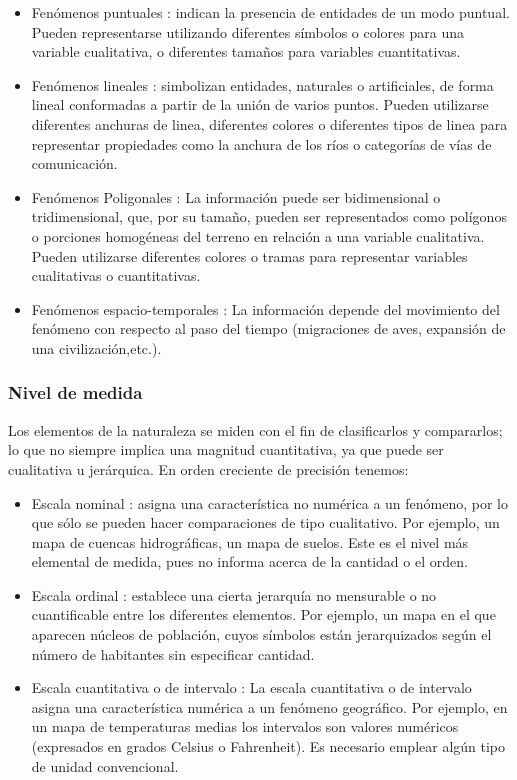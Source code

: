 \begin{itemize}
    \item Fenómenos puntuales : indican la presencia de entidades de un modo puntual. Pueden representarse
    utilizando diferentes símbolos o colores para una variable cualitativa, o diferentes tamaños para variables
    cuantitativas.

    \item Fenómenos lineales : simbolizan entidades, naturales o artificiales, de forma lineal conformadas a
    partir de la unión de varios puntos. Pueden utilizarse diferentes anchuras de linea, diferentes colores o
    diferentes tipos de linea para representar propiedades como la anchura de los ríos o categorías de vías de
    comunicación.

    \item Fenómenos Poligonales : La información puede ser bidimensional o tridimensional, que, por su tamaño,
    pueden ser representados como polígonos o porciones homogéneas del terreno en relación a una variable
    cualitativa. Pueden utilizarse diferentes colores o tramas para representar variables cualitativas o
    cuantitativas.

    \item Fenómenos espacio-temporales : La información depende del movimiento del fenómeno con respecto al paso
    del tiempo (migraciones de aves, expansión de una civilización,etc.).
\end{itemize}

\subsubsection{Nivel de medida}
Los elementos de la naturaleza se miden con el fin de clasificarlos y compararlos; lo que no
siempre implica una magnitud cuantitativa, ya que puede ser cualitativa u jerárquica. En orden
creciente de precisión tenemos:
\begin{itemize}
    \item Escala nominal : asigna una característica no numérica a un fenómeno, por lo que sólo se pueden hacer comparaciones de tipo cualitativo. Por ejemplo, un mapa de cuencas hidrográficas, un mapa de suelos. Este es el nivel más elemental de medida, pues no informa acerca de la cantidad o el orden.

    \item Escala ordinal : establece una cierta jerarquía no mensurable o no cuantificable entre los diferentes elementos. Por ejemplo, un mapa en el que aparecen núcleos de población, cuyos símbolos están jerarquizados según el número de habitantes sin especificar cantidad.

    \item Escala cuantitativa o de intervalo : La escala cuantitativa o de intervalo asigna una característica numérica a un fenómeno geográfico. Por ejemplo, en un mapa de temperaturas medias los intervalos son valores numéricos (expresados en grados Celsius o Fahrenheit). Es necesario emplear algún tipo de unidad convencional.
\end{itemize}

